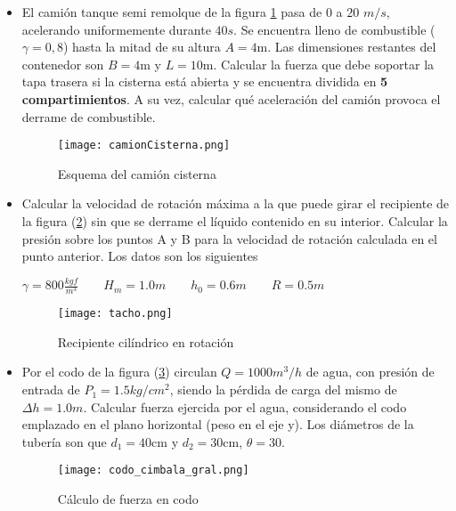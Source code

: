 \begin{itemize}
\item El camión tanque semi remolque de la figura \ref{fig:remolque} pasa de $0$ a $20$ $m/s$, acelerando uniformemente durante $40s$. Se encuentra lleno de combustible ($\gamma=0,8$) hasta la mitad de su altura $A = 4$m. Las dimensiones restantes del contenedor son $B = 4$m y $L = 10$m. Calcular la fuerza que debe soportar la tapa trasera si la cisterna est\'a abierta y se encuentra dividida en \textbf{5 compartimientos}. A su vez, calcular qué aceleración del camión provoca el derrame de combustible.
  \begin{figure}[!ht]
    \centering
    \texttt{[image: camionCisterna.png]}
    \caption{Esquema del camión cisterna}
    \label{fig:remolque}
  \end{figure}

 \item Calcular la velocidad de rotación máxima a la que puede girar el recipiente de la figura (\ref{fig:tacho}) sin que se derrame el líquido contenido en su interior. Calcular la presión sobre los puntos A y B para la velocidad de rotación calculada en el punto anterior. Los datos son los siguientes
  \begin{center}
    $\gamma = 800\frac{kgf}{m^3} \qquad H_m = 1.0 m \qquad h_0 = 0.6 m\qquad R = 0.5 m$
  \end{center}
  \begin{figure}[h!!]
    \centering
    \texttt{[image: tacho.png]}
    \caption{Recipiente cilíndrico en rotación}
    \label{fig:tacho}
  \end{figure}

\item Por el codo de la figura (\ref{fig:codo}) circulan $Q=1000 m^3/h$ de agua, con presión de entrada de $P_1 = 1.5 kg/cm^2$, siendo la pérdida de carga del mismo  de $\Delta h = 1.0m$. Calcular fuerza ejercida por el agua, considerando el codo emplazado en el plano horizontal (peso en el eje y). Los diámetros de la tubería son que $d_1 = 40$cm y $d_2 = 30$cm, $\theta = 30$. 
      \vspace{0.5cm}
      \begin{figure}[h!!]
      \centering
      \texttt{[image: codo\_cimbala\_gral.png]}
      \caption{Cálculo de fuerza en codo}
      \label{fig:codo}
      \end{figure}  
      

\end{itemize}
